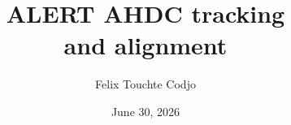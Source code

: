 \documentclass[10pt,aspectratio=43]{beamer}
\title{ALERT AHDC tracking \\ and alignment}
\author{Felix Touchte Codjo}
\institute{IJCLab}
\date{June 30, 2026}
\begin{document}
\begin{frame}[plain] %
\titlepage
\end{frame}



    
\end{document}
